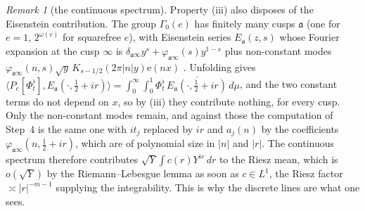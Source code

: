 \documentclass[11pt,a4paper]{article}
\theoremstyle{remark}\newtheorem{remark}[theorem]{Remark}
\newcommand{\e}{\mathrm e}\newcommand{\Off}{\mathrm{Off}}\newcommand{\rep}[2]{\langle #1\rangle_{#2}}
\begin{document}
\begin{remark}[the continuous spectrum]\label{rem:eisenstein}
Property (iii) also disposes of the Eisenstein contribution. The group $\Gamma_0(e)$ has finitely many cusps
$\mathfrak a$ (one for $e=1$, $2^{\omega(e)}$ for squarefree $e$), with Eisenstein series $E_{\mathfrak a}(z,s)$ whose
Fourier expansion at the cusp $\infty$ is $\delta_{\mathfrak a\infty}y^s+\varphi_{\mathfrak a\infty}(s)y^{1-s}$ plus
non-constant modes $\varphi_{\mathfrak a\infty}(n,s)\sqrt y\,K_{s-1/2}(2\pi|n|y)\e(nx)$
\cite[Theorem~3.4]{Iwaniec2002}. Unfolding gives
$\langle P_e[\Phi^\flat_t],E_{\mathfrak a}(\cdot,\tfrac12+ir)\rangle=\int_0^\infty\!\!\int_0^1\Phi^\flat_t\,\overline{E_{\mathfrak a}(\cdot,\tfrac12+ir)}\,d\mu$,
and the two constant terms do not depend on $x$, so by (iii) they contribute nothing, for every cusp. Only the
non-constant modes remain, and against those the computation of Step~4 is the same one with $it_j$ replaced by $ir$
and $a_j(n)$ by the coefficients $\varphi_{\mathfrak a\infty}(n,\tfrac12+ir)$, which are of polynomial size in $|n|$
and $|r|$. The continuous spectrum therefore contributes $\sqrt Y\int c(r)Y^{ir}\,dr$ to the Riesz mean, which is
$o(\sqrt Y)$ by the Riemann--Lebesgue lemma as soon as $c\in L^1$, the Riesz factor $\asymp|r|^{-m-1}$ supplying the
integrability. This is why the discrete lines are what one sees.
\end{remark}
\end{document}
